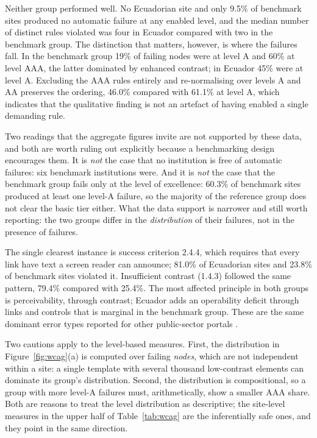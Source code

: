 \documentclass[pdflatex,sn-basic,Numbered,iicol]{sn-jnl}
\theoremstyle{thmstyleone}
\theoremstyle{thmstyletwo}
\theoremstyle{thmstylethree}
\begin{document}
Neither group performed well. No Ecuadorian site and only 9.5\% of benchmark sites produced no automatic failure at any enabled level, and the median number of distinct rules violated was four in Ecuador compared with two in the benchmark group. The distinction that matters, however, is where the failures fall. In the benchmark group 19\% of failing nodes were at level A and 60\% at level AAA, the latter dominated by enhanced contrast; in Ecuador 45\% were at level A. Excluding the AAA rules entirely and re-normalising over levels A and AA preserves the ordering, 46.0\% compared with 61.1\% at level A, which indicates that the qualitative finding is not an artefact of having enabled a single demanding rule.

Two readings that the aggregate figures invite are not supported by these data, and both are worth ruling out explicitly because a benchmarking design encourages them. It is \emph{not} the case that no institution is free of automatic failures: six benchmark institutions were. And it is \emph{not} the case that the benchmark group fails only at the level of excellence: 60.3\% of benchmark sites produced at least one level-A failure, so the majority of the reference group does not clear the basic tier either. What the data support is narrower and still worth reporting: the two groups differ in the \emph{distribution} of their failures, not in the presence of failures.

The single clearest instance is success criterion 2.4.4, which requires that every link have text a screen reader can announce; 81.0\% of Ecuadorian sites and 23.8\% of benchmark sites violated it. Insufficient contrast (1.4.3) followed the same pattern, 79.4\% compared with 25.4\%. The most affected principle in both groups is perceivability, through contrast; Ecuador adds an operability deficit through links and controls that is marginal in the benchmark group. These are the same dominant error types reported for other public-sector portals \citep{iniesto2025service,aljedaani2025egovernment}.

Two cautions apply to the level-based measures. First, the distribution in Figure~\ref{fig:wcag}(a) is computed over failing \emph{nodes}, which are not independent within a site: a single template with several thousand low-contrast elements can dominate its group's distribution. Second, the distribution is compositional, so a group with more level-A failures must, arithmetically, show a smaller AAA share. Both are reasons to treat the level distribution as descriptive; the site-level measures in the upper half of Table~\ref{tab:wcag} are the inferentially safe ones, and they point in the same direction.
\end{document}
